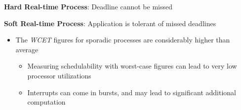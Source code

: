 \documentclass[a4paper,11pt]{article}
\begin{document}
\Needspace{75pt}

\textbf{Hard Real-time Process}: Deadline cannot be missed\par

\Needspace{100pt}
\textbf{Soft Real-time Process}: Application is tolerant of missed deadlines\par

\begin{itemize}
\item The \emph{WCET} figures for sporadic processes are considerably higher than average
\begin{itemize}
\item Measuring schedulability with worst-case figures can lead to very low processor utilizations
\item Interrupts can come in bursts, and may lead to significant additional computation
\end{itemize}
\end{itemize}
\end{document}
